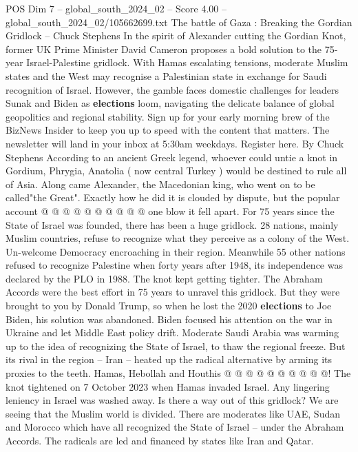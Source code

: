 \begin{textsample}{POS Dim 7 – global\_south\_2024\_02 – Score 4.00 – global\_south\_2024\_02/105662699.txt}  \label{ex:f7_pos_206}
The battle of Gaza : Breaking the Gordian Gridlock -- Chuck Stephens In the spirit of Alexander cutting the Gordian Knot, former UK Prime Minister David Cameron proposes a bold solution to the 75-year Israel-Palestine gridlock.
With Hamas escalating tensions, moderate Muslim states and the West may recognise a Palestinian state in exchange for Saudi recognition of Israel.
However, the gamble faces domestic challenges for leaders Sunak and Biden as \textbf{elections} loom, navigating the delicate balance of global geopolitics and regional stability.
Sign up for your early morning brew of the BizNews Insider to keep you up to speed with the content that matters.
The newsletter will land in your inbox at 5:30am weekdays.
Register here.
By Chuck Stephens According to an ancient Greek legend, whoever could untie a knot in Gordium, Phrygia, Anatolia ( now central Turkey ) would be destined to rule all of Asia.
Along came Alexander, the Macedonian king, who went on to be called"the Great".
Exactly how he did it is clouded by dispute, but the popular account @ @ @ @ @ @ @ @ @ @ one blow it fell apart.
For 75 years since the State of Israel was founded, there has been a huge gridlock. 28 nations, mainly Muslim countries, refuse to recognize what they perceive as a colony of the West.
Un-welcome Democracy encroaching in their region.
Meanwhile 55 other nations refused to recognize Palestine when forty years after 1948, its independence was declared by the PLO in 1988.
The knot kept getting tighter.
The Abraham Accords were the best effort in 75 years to unravel this gridlock.
But they were brought to you by Donald Trump, so when he lost the 2020 \textbf{elections} to Joe Biden, his solution was abandoned.
Biden focused his attention on the war in Ukraine and let Middle East policy drift.
Moderate Saudi Arabia was warming up to the idea of recognizing the State of Israel, to thaw the regional freeze.
But its rival in the region -- Iran -- heated up the radical alternative by arming its proxies to the teeth.
Hamas, Hebollah and Houthis @ @ @ @ @ @ @ @ @ @!
The knot tightened on 7 October 2023 when Hamas invaded Israel.
Any lingering leniency in Israel was washed away.
Is there a way out of this gridlock?
We are seeing that the Muslim world is divided.
There are moderates like UAE, Sudan and Morocco which have all recognized the State of Israel -- under the Abraham Accords.
The radicals are led and financed by states like Iran and Qatar.

\end{textsample}
